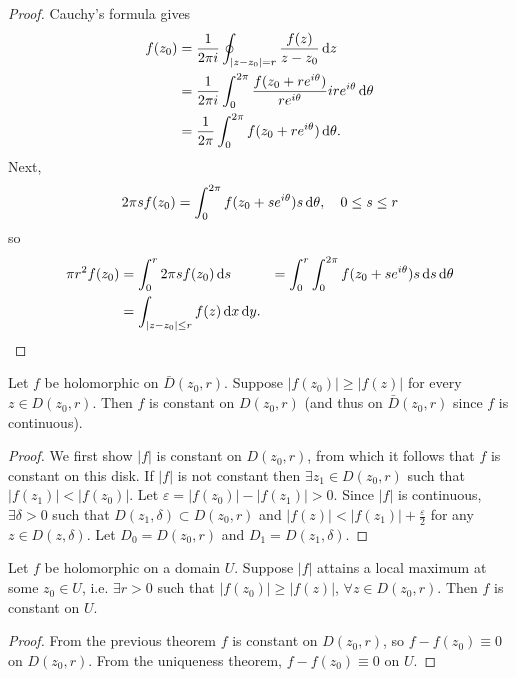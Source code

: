 \begin{proof}
Cauchy's formula gives
\begin{align*}
   f(z_0)
&= \frac{1}{2 \pi i}
   \oint_{|z - z_0| = r}
     \frac{f(z)}{z - z_0}
     \mathop{}\!\mathrm{d} z \\
&= \frac{1}{2 \pi i}
   \int_0^{2 \pi}
     \frac{f(z_0 + r e^{i\theta})}
          {re^{i \theta}}
     i r e^{i \theta}
     \mathop{}\!\mathrm{d} \theta \\
&= \frac{1}{2 \pi}
   \int_0^{2\pi}
     f(z_0 + r e^{i \theta})
     \mathop{}\!\mathrm{d} \theta.
\end{align*}
Next,
$$
  2 \pi s f(z_0)
= \int_0^{2 \pi}
    f(z_0 + s e^{i\theta}) s
    \mathop{}\!\mathrm{d} \theta, \quad
0 \leq s \leq r
$$
so
\begin{align*}
   \pi r^2 f(z_0)
&= \int_0^r
     2 \pi s f(z_0)
     \mathop{}\!\mathrm{d} s
&= \int_0^r \int_0^{2\pi}
     f(z_0 + s e^{i\theta}) s
     \mathop{}\!\mathrm{d} s \mathop{}\!\mathrm{d} \theta \\
&= \int_{|z - z_0| \leq r}
     f(z)
     \mathop{}\!\mathrm{d} x \mathop{}\!\mathrm{d} y.
\end{align*}
\end{proof}

\begin{theorem}
Let $f$ be holomorphic on $\bar{D}(z_0, r)$.
Suppose $|f(z_0)| \geq |f(z)|$ for every $z \in D(z_0, r)$.
Then $f$ is constant on $D(z_0, r)$ (and thus on
$\bar{D}(z_0, r)$ since $f$ is continuous).
\end{theorem}

\begin{proof}
We first show $|f|$ is constant on $D(z_0, r)$, from which it
follows that $f$ is constant on this disk. If $|f|$ is not
constant then $\exists z_1 \in D(z_0, r)$ such that
$|f(z_1)| < |f(z_0)|$. Let $\varepsilon = |f(z_0)| - |f(z_1)| > 0$.
Since $|f|$ is continuous, $\exists \delta > 0$ such that
$D(z_1, \delta) \subset D(z_0, r)$ and
$|f(z)| < |f(z_1)| + \frac{\varepsilon}{2}$ for any $z \in D(z, \delta)$.
Let $D_0 = D(z_0, r)$ and $D_1 = D(z_1, \delta)$.
\end{proof}

\begin{corol}
Let $f$ be holomorphic on a domain $U$. Suppose $|f|$ attains a local
maximum at some $z_0 \in U$, i.e. $\exists r > 0$ such that
$|f(z_0)| \geq |f(z)|$, $\forall z \in D(z_0, r)$. Then $f$ is constant
on $U$.
\end{corol}

\begin{proof}
From the previous theorem $f$ is constant on $D(z_0, r)$, so
$f - f(z_0) \equiv 0$ on $D(z_0, r)$. From the uniqueness theorem,
$f - f(z_0) \equiv 0$ on $U$.
\end{proof}

